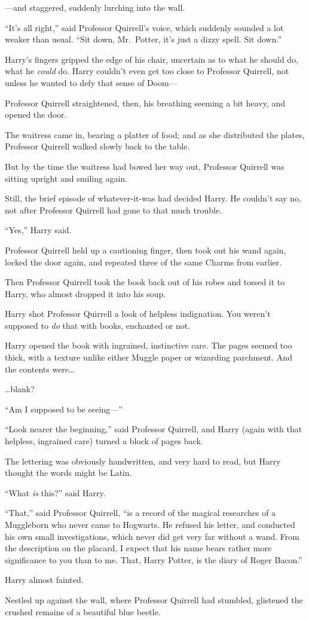 ---and staggered, suddenly lurching into the wall.

``It's all right,'' said Professor Quirrell's voice, which suddenly
sounded a lot weaker than usual. ``Sit down, Mr.~Potter, it's just a
dizzy spell. Sit down.''

Harry's fingers gripped the edge of his chair, uncertain as to what he
should do, what he \emph{could} do. Harry couldn't even get too close to
Professor Quirrell, not unless he wanted to defy that sense of Doom---

Professor Quirrell straightened, then, his breathing seeming a bit
heavy, and opened the door.

The waitress came in, bearing a platter of food; and as she distributed
the plates, Professor Quirrell walked slowly back to the table.

But by the time the waitress had bowed her way out, Professor Quirrell
was sitting upright and smiling again.

Still, the brief episode of whatever-it-was had decided Harry. He
couldn't say no, not after Professor Quirrell had gone to that much
trouble.

``Yes,'' Harry said.

Professor Quirrell held up a cautioning finger, then took out his wand
again, locked the door again, and repeated three of the same Charms from
earlier.

Then Professor Quirrell took the book back out of his robes and tossed
it to Harry, who almost dropped it into his soup.

Harry shot Professor Quirrell a look of helpless indignation. You
weren't supposed to \emph{do} that with books, enchanted or not.

Harry opened the book with ingrained, instinctive care. The pages seemed
too thick, with a texture unlike either Muggle paper or wizarding
parchment. And the contents were\ldots{}

\ldots{}blank?

``Am I supposed to be seeing---''

``Look nearer the beginning,'' said Professor Quirrell, and Harry (again
with that helpless, ingrained care) turned a block of pages back.

The lettering was obviously handwritten, and very hard to read, but
Harry thought the words might be Latin.

``What \emph{is} this?'' said Harry.

``That,'' said Professor Quirrell, ``is a record of the magical
researches of a Muggleborn who never came to Hogwarts. He refused his
letter, and conducted his own small investigations, which never did get
very far without a wand. From the description on the placard, I expect
that his name bears rather more significance to you than to me. That,
Harry Potter, is the diary of Roger Bacon.''

Harry almost fainted.

Nestled up against the wall, where Professor Quirrell had stumbled,
glistened the crushed remains of a beautiful blue beetle.
